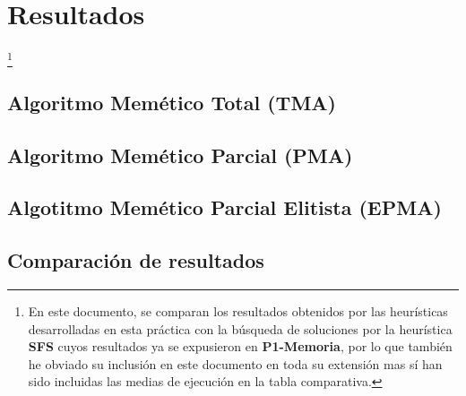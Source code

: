 \documentclass[a4paper, 11pt]{article}
\begin{document}
	\section{Resultados}\footnote{En este documento, se comparan los resultados obtenidos por las
	heurísticas desarrolladas en esta práctica con la búsqueda de soluciones por la heurística
	\textbf{SFS} cuyos resultados ya se expusieron en \textbf{P1-Memoria}, por lo que también he
	obviado su inclusión en este documento en toda su extensión mas sí han sido incluidas las medias
	de ejecución en la tabla comparativa.}
	
		\subsection{Algoritmo Memético Total (\textbf{TMA})}
			
			
			
		\subsection{Algoritmo Memético Parcial (\textbf{PMA})}
			
			
			
		\subsection{Algotitmo Memético Parcial Elitista (\textbf{EPMA})}
			
			
			
		\subsection{Comparación de resultados}
			
			
\end{document}
